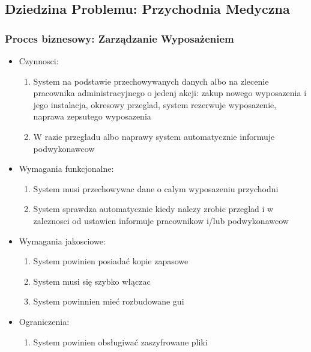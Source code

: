 \documentclass{article}
\begin{document}
\subsection* {Dziedzina Problemu: Przychodnia Medyczna}
\subsubsection*{Proces biznesowy: Zarządzanie Wyposażeniem}

\begin{itemize}
	\item Czynnosci:
		\begin{enumerate}
			\item System na podstawie przechowywanych danych albo na zlecenie pracownika administracyjnego o jedenj akcji: zakup nowego wyposazenia i jego instalacja, okresowy przeglad, system rezerwuje wyposazenie, naprawa zepsutego wyposazenia
			\item W razie przegladu albo naprawy system automatycznie informuje podwykonawcow
		\end{enumerate}
	\item Wymagania funkcjonalne: 
		\begin{enumerate}
			\item System musi przechowywac dane o calym wyposazeniu przychodni
			\item System sprawdza automatycznie kiedy nalezy zrobic przeglad i w zaleznosci od ustawien informuje pracownikow i/lub podwykonawcow 
		\end{enumerate}
	\item Wymagania jakosciowe:
		\begin{enumerate}
			\item System powinien posiadać kopie zapasowe
			\item System musi się szybko włączac 
			\item System powinnien mieć rozbudowane gui
		\end{enumerate}
	\item Ograniczenia:
		\begin{enumerate}
			\item System powinien obsługiwać zaszyfrowane pliki 
		\end{enumerate}
\end{itemize}
\end{document}
